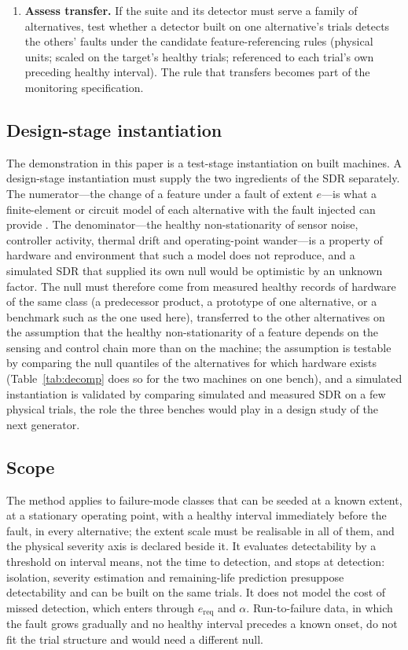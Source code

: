 \begin{enumerate}
  \item \textbf{Assess transfer.} If the suite and its detector must serve a family of alternatives, test whether a detector built on one alternative's trials detects the others' faults under the candidate feature-referencing rules (physical units; scaled on the target's healthy trials; referenced to each trial's own preceding healthy interval). The rule that transfers becomes part of the monitoring specification.
\end{enumerate}

\subsection{Design-stage instantiation}\label{sec:design-stage}

The demonstration in this paper is a test-stage instantiation on built machines. A design-stage instantiation must supply the two ingredients of the SDR separately. The numerator---the change of a feature under a fault of extent $e$---is what a finite-element or circuit model of each alternative with the fault injected can provide \citep{Vaseghi2009}. The denominator---the healthy non-stationarity of sensor noise, controller activity, thermal drift and operating-point wander---is a property of hardware and environment that such a model does not reproduce, and a simulated SDR that supplied its own null would be optimistic by an unknown factor. The null must therefore come from measured healthy records of hardware of the same class (a predecessor product, a prototype of one alternative, or a benchmark such as the one used here), transferred to the other alternatives on the assumption that the healthy non-stationarity of a feature depends on the sensing and control chain more than on the machine; the assumption is testable by comparing the null quantiles of the alternatives for which hardware exists (Table~\ref{tab:decomp} does so for the two machines on one bench), and a simulated instantiation is validated by comparing simulated and measured SDR on a few physical trials, the role the three benches would play in a design study of the next generator.

\subsection{Scope}\label{sec:scope}

The method applies to failure-mode classes that can be seeded at a known extent, at a stationary operating point, with a healthy interval immediately before the fault, in every alternative; the extent scale must be realisable in all of them, and the physical severity axis is declared beside it. It evaluates detectability by a threshold on interval means, not the time to detection, and stops at detection: isolation, severity estimation and remaining-life prediction presuppose detectability and can be built on the same trials. It does not model the cost of missed detection, which enters through $e_{\mathrm{req}}$ and $\alpha$. Run-to-failure data, in which the fault grows gradually and no healthy interval precedes a known onset, do not fit the trial structure and would need a different null.
